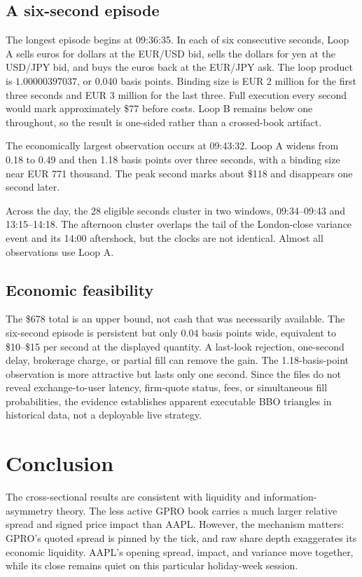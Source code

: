 \documentclass[11pt]{article}
\begin{document}
\subsection{A six-second episode}

The longest episode begins at 09:36:35. In each of six consecutive seconds, Loop A sells euros for dollars at the EUR/USD bid, sells the dollars for yen at the USD/JPY bid, and buys the euros back at the EUR/JPY ask. The loop product is $1.00000397037$, or 0.040 basis points. Binding size is EUR 2 million for the first three seconds and EUR 3 million for the last three. Full execution every second would mark approximately \$77 before costs. Loop B remains below one throughout, so the result is one-sided rather than a crossed-book artifact.

The economically largest observation occurs at 09:43:32. Loop A widens from 0.18 to 0.49 and then 1.18 basis points over three seconds, with a binding size near EUR 771 thousand. The peak second marks about \$118 and disappears one second later.

Across the day, the 28 eligible seconds cluster in two windows, 09:34--09:43 and 13:15--14:18. The afternoon cluster overlaps the tail of the London-close variance event and its 14:00 aftershock, but the clocks are not identical. Almost all observations use Loop A.

\subsection{Economic feasibility}

The \$678 total is an upper bound, not cash that was necessarily available. The six-second episode is persistent but only 0.04 basis points wide, equivalent to \$10--\$15 per second at the displayed quantity. A last-look rejection, one-second delay, brokerage charge, or partial fill can remove the gain. The 1.18-basis-point observation is more attractive but lasts only one second. Since the files do not reveal exchange-to-user latency, firm-quote status, fees, or simultaneous fill probabilities, the evidence establishes apparent executable BBO triangles in historical data, not a deployable live strategy.

\section{Conclusion}

The cross-sectional results are consistent with liquidity and information-asymmetry theory. The less active GPRO book carries a much larger relative spread and signed price impact than AAPL. However, the mechanism matters: GPRO's quoted spread is pinned by the tick, and raw share depth exaggerates its economic liquidity. AAPL's opening spread, impact, and variance move together, while its close remains quiet on this particular holiday-week session.
\end{document}
